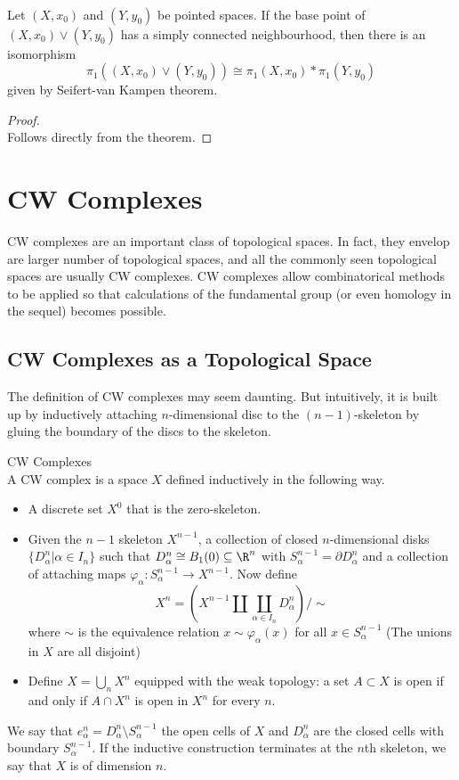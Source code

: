 \documentclass[a4paper]{article}
\begin{document}
\begin{lmm}{}{}\\
Let $(X,x_0)$ and $(Y,y_0)$ be pointed spaces. If the base point of $(X,x_0)\vee(Y,y_0)$ has a simply connected neighbourhood, then there is an isomorphism $$\pi_1((X,x_0)\vee(Y,y_0))\cong\pi_1(X,x_0)\ast\pi_1(Y,y_0)$$ given by Seifert-van Kampen theorem. 
\begin{proof}\\
Follows directly from the theorem. 
\end{proof}
\end{lmm}

\pagebreak
\section{CW Complexes}
CW complexes are an important class of topological spaces. In fact, they envelop are larger number of topological spaces, and all the commonly seen topological spaces are usually CW complexes. CW complexes allow combinatorical methods to be applied so that calculations of the fundamental group (or even homology in the sequel) becomes possible. 

\subsection{CW Complexes as a Topological Space}
The definition of CW complexes may seem daunting. But intuitively, it is built up by inductively attaching $n$-dimensional disc to the $(n-1)$-skeleton by gluing the boundary of the discs to the skeleton. 

\begin{defn}{CW Complexes}{}\\
A CW complex is a space $X$ defined inductively in the following way. 
\begin{itemize}
\item A discrete set $X^0$ that is the zero-skeleton. 
\item Given the $n-1$ skeleton $X^{n-1}$, a collection of closed $n$-dimensional disks $\{D_{\alpha}^n|\alpha\in I_n\}$ such that $D_\alpha^n\cong B_1(0)\subseteq\R^n$ with $S_\alpha^{n-1}=\partial D_\alpha^n$ and a collection of attaching maps $\varphi_\alpha:S_\alpha^{n-1}\to X^{n-1}$. Now define $$X^n=\left(X^{n-1}\amalg\coprod_{\alpha\in I_n}D_\alpha^n\right)/\sim$$ where $\sim$ is the equivalence relation $x\sim\varphi_\alpha(x)$ for all $x\in S_\alpha^{n-1}$ (The unions in $X$ are all disjoint)
\item Define $X=\bigcup_nX^n$ equipped with the weak topology: a set $A\subset X$ is open if and only if $A\cap X^n$ is open in $X^n$ for every $n$. 
\end{itemize}
We say that $e_\alpha^n=D_\alpha^n\setminus S_\alpha^{n-1}$ the open cells of $X$ and $D_\alpha^n$ are the closed cells with boundary $S_\alpha^{n-1}$. If the inductive construction terminates at the $n$th skeleton, we say that $X$ is of dimension $n$. 
\end{defn}
\end{document}

